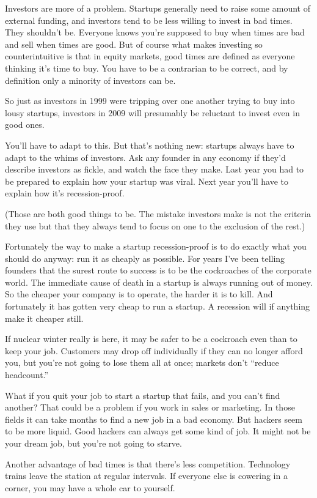 Investors are more of a problem. Startups generally need to raise some
amount of external funding, and investors tend to be less willing to
invest in bad times. They shouldn't be. Everyone knows you're supposed
to buy when times are bad and sell when times are good. But of course
what makes investing so counterintuitive is that in equity markets, good
times are defined as everyone thinking it's time to buy. You have to be
a contrarian to be correct, and by definition only a minority of
investors can be.

So just as investors in 1999 were tripping over one another trying to
buy into lousy startups, investors in 2009 will presumably be reluctant
to invest even in good ones.

You'll have to adapt to this. But that's nothing new: startups always
have to adapt to the whims of investors. Ask any founder in any economy
if they'd describe investors as fickle, and watch the face they make.
Last year you had to be prepared to explain how your startup was viral.
Next year you'll have to explain how it's recession-proof.

(Those are both good things to be. The mistake investors make is not the
criteria they use but that they always tend to focus on one to the
exclusion of the rest.)

Fortunately the way to make a startup recession-proof is to do exactly
what you should do anyway: run it as cheaply as possible. For years I've
been telling founders that the surest route to success is to be the
cockroaches of the corporate world. The immediate cause of death in a
startup is always running out of money. So the cheaper your company is
to operate, the harder it is to kill. And fortunately it has gotten very
cheap to run a startup. A recession will if anything make it cheaper
still.

If nuclear winter really is here, it may be safer to be a cockroach even
than to keep your job. Customers may drop off individually if they can
no longer afford you, but you're not going to lose them all at once;
markets don't ``reduce headcount.''

What if you quit your job to start a startup that fails, and you can't
find another? That could be a problem if you work in sales or marketing.
In those fields it can take months to find a new job in a bad economy.
But hackers seem to be more liquid. Good hackers can always get some
kind of job. It might not be your dream job, but you're not going to
starve.

Another advantage of bad times is that there's less competition.
Technology trains leave the station at regular intervals. If everyone
else is cowering in a corner, you may have a whole car to yourself.


